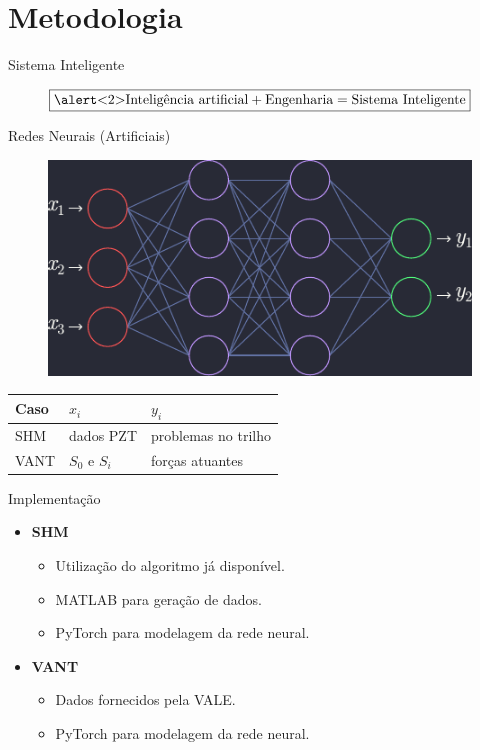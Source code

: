 \section{Metodologia}

\begin{frame}{Sistema Inteligente}

    \[\boxed{\text{\alert<2>{Inteligência artificial}} + \text{Engenharia} = \text{Sistema Inteligente}}\] 
\end{frame}

\begin{frame}{Redes Neurais (Artificiais)}
\pause
\begin{figure}
\centering
\includegraphics{figures/rede_neural.pdf}
\end{figure}
\pause
\begin{table}
\centering
\begin{tabular}{|l|l|l|}
    \hline
    Caso & \(x_i\)           & \(y_i\)             \\ \hline
    SHM  & dados PZT         & \alert<4>{problemas no trilho} \\ \hline
    VANT & \(S_0\) e \(S_i\) & forças atuantes     \\ \hline
\end{tabular}
\end{table}
\end{frame}

\begin{frame}{Implementação}
\pause
\begin{itemize}
    \item \textbf{SHM}
        \begin{itemize}
            \item<3-4> Utilização do algoritmo já disponível.
            \item<3-4> MATLAB para geração de dados.
            \item<3-4> PyTorch para modelagem da rede neural.
        \end{itemize}
    \item \textbf{VANT}
    \begin{itemize}
        \item<4> Dados fornecidos pela VALE.
        \item<4> PyTorch para modelagem da rede neural.
    \end{itemize}
\end{itemize}
    
\end{frame}